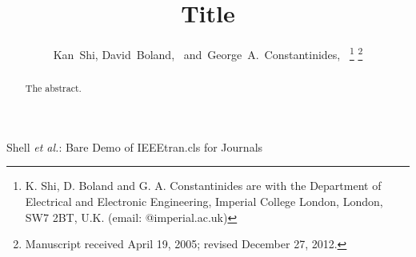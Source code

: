 \documentclass[journal]{IEEEtran}
\begin{document}
\title{Title}

\author{Kan~Shi,
        David~Boland,~
        and~George~A.~Constantinides,~%
	\thanks{K. Shi, D. Boland and G. A. Constantinides are with the Department of Electrical and Electronic Engineering, Imperial College London, London, SW7 2BT, U.K. (email: {}@imperial.ac.uk)}%
\thanks{Manuscript received April 19, 2005; revised December 27, 2012.}}

% 
%



%
{Shell \MakeLowercase{\textit{et al.}}: Bare Demo of IEEEtran.cls for Journals}

\maketitle

\begin{abstract}
The abstract.
\end{abstract}
\end{document}
